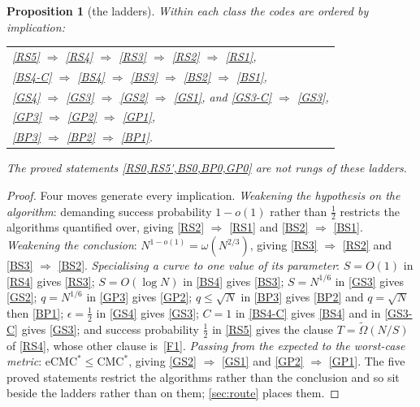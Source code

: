 \documentclass[11pt]{article}
\theoremstyle{plain}
\newtheorem{proposition}{Proposition}
\theoremstyle{definition}
\newcommand{\eCMCs}{\mathrm{eCMC}^{*}}
\newcommand{\CMCs}{\mathrm{CMC}^{*}}
\begin{document}
\begin{proposition}[the ladders]\label{p:ladders}
Within each class the codes are ordered by implication:
\begin{center}
\begin{tabular}{@{}l@{}}
\ref{RS5} $\Rightarrow$ \ref{RS4} $\Rightarrow$ \ref{RS3} $\Rightarrow$
  \ref{RS2} $\Rightarrow$ \ref{RS1},\\
\ref{BS4-C} $\Rightarrow$ \ref{BS4} $\Rightarrow$ \ref{BS3} $\Rightarrow$
  \ref{BS2} $\Rightarrow$ \ref{BS1},\\
\ref{GS4} $\Rightarrow$ \ref{GS3} $\Rightarrow$ \ref{GS2} $\Rightarrow$
  \ref{GS1}, \quad and \quad \ref{GS3-C} $\Rightarrow$ \ref{GS3},\\
\ref{GP3} $\Rightarrow$ \ref{GP2} $\Rightarrow$ \ref{GP1},\\
\ref{BP3} $\Rightarrow$ \ref{BP2} $\Rightarrow$ \ref{BP1}.
\end{tabular}
\end{center}
The proved statements \cref{RS0,RS5',BS0,BP0,GP0} are not rungs of these
ladders.
\end{proposition}

\begin{proof}
Four moves generate every implication.  \emph{Weakening the hypothesis on
the algorithm}: demanding success probability $1-o(1)$ rather than $\tfrac12$
restricts the algorithms quantified over, giving \ref{RS2} $\Rightarrow$
\ref{RS1} and \ref{BS2} $\Rightarrow$ \ref{BS1}.  \emph{Weakening the
conclusion}: $N^{1-o(1)}=\omega(N^{2/3})$, giving \ref{RS3} $\Rightarrow$
\ref{RS2} and \ref{BS3} $\Rightarrow$ \ref{BS2}.  \emph{Specialising a curve
to one value of its parameter}: $S=O(1)$ in \cref{RS4} gives \cref{RS3};
$S=O(\log N)$ in \cref{BS4} gives \cref{BS3}; $S=N^{1/6}$ in \cref{GS3} gives
\cref{GS2}; $q=N^{1/6}$ in \cref{GP3} gives \cref{GP2}; $q\leq\sqrt N$ in
\cref{BP3} gives \cref{BP2} and $q=\sqrt N$ then \cref{BP1};
$\epsilon=\tfrac12$ in \cref{GS4} gives \cref{GS3}; $C=1$ in \cref{BS4-C}
gives \cref{BS4} and in \cref{GS3-C} gives \cref{GS3}; and success
probability $\tfrac12$ in \cref{RS5} gives the clause $T=\tilde\Omega(N/S)$
of \cref{RS4}, whose other clause is~\ref{F1}.  \emph{Passing from the
expected to the worst-case metric}: $\eCMCs\leq\CMCs$, giving \ref{GS2}
$\Rightarrow$ \ref{GS1} and \ref{GP2} $\Rightarrow$ \ref{GP1}.  The five
proved statements restrict the algorithms rather than the conclusion and so
sit beside the ladders rather than on them; \cref{sec:route} places them.
\end{proof}
\end{document}
